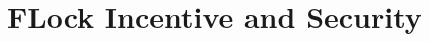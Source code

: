 \documentclass[conference]{IEEEtran}
\newcommand{\FML}{\ensuremath{\xspace\texttt{\$FLOCK}}\xspace}
\begin{document}
    






\section{FLock Incentive and Security}
\end{document}
